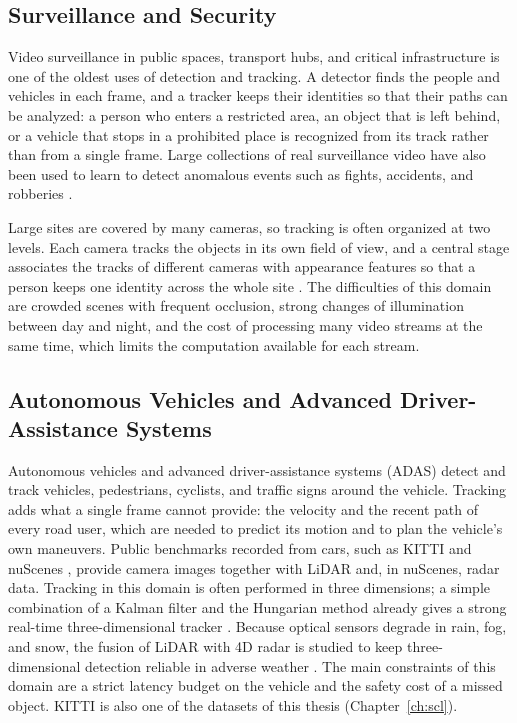 \subsection{Surveillance and Security}\label{sec:bg-app-surv}
Video surveillance in public spaces, transport hubs, and critical infrastructure is one of the oldest uses of detection and tracking. A detector finds the people and vehicles in each frame, and a tracker keeps their identities so that their paths can be analyzed: a person who enters a restricted area, an object that is left behind, or a vehicle that stops in a prohibited place is recognized from its track rather than from a single frame. Large collections of real surveillance video have also been used to learn to detect anomalous events such as fights, accidents, and robberies \cite{sultani2018anomaly}.

Large sites are covered by many cameras, so tracking is often organized at two levels. Each camera tracks the objects in its own field of view, and a central stage associates the tracks of different cameras with appearance features so that a person keeps one identity across the whole site \cite{ristani2016idf1,ristani2018features}. The difficulties of this domain are crowded scenes with frequent occlusion, strong changes of illumination between day and night, and the cost of processing many video streams at the same time, which limits the computation available for each stream.

\subsection{Autonomous Vehicles and Advanced Driver-Assistance Systems}\label{sec:bg-app-av}
Autonomous vehicles and advanced driver-assistance systems (ADAS) detect and track vehicles, pedestrians, cyclists, and traffic signs around the vehicle. Tracking adds what a single frame cannot provide: the velocity and the recent path of every road user, which are needed to predict its motion and to plan the vehicle's own maneuvers. Public benchmarks recorded from cars, such as KITTI \cite{geiger2012kitti} and nuScenes \cite{caesar2020nuscenes}, provide camera images together with LiDAR and, in nuScenes, radar data. Tracking in this domain is often performed in three dimensions; a simple combination of a Kalman filter and the Hungarian method already gives a strong real-time three-dimensional tracker \cite{weng2020ab3dmot}. Because optical sensors degrade in rain, fog, and snow, the fusion of LiDAR with 4D radar is studied to keep three-dimensional detection reliable in adverse weather \cite{chae2024radar}. The main constraints of this domain are a strict latency budget on the vehicle and the safety cost of a missed object. KITTI is also one of the datasets of this thesis (Chapter~\ref{ch:scl}).

